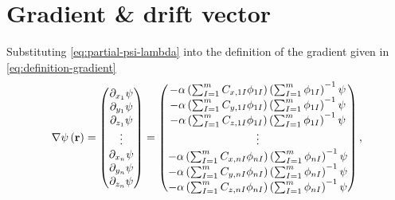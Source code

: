 \section{Gradient \& drift vector}
Substituting \cref{eq:partial-psi-lambda}
into the definition of the gradient given in \cref{eq:definition-gradient}
\begin{equation}
    \nabla
    \psi \left( \boldsymbol{\mathrm{r}} \right)
    =
    \begin{pmatrix}
        \partial_{x_1} \psi \\
        \partial_{y_1} \psi \\
        \partial_{z_1} \psi \\
        \vdots \\
        \partial_{x_n} \psi \\
        \partial_{y_n} \psi \\
        \partial_{z_n} \psi
    \end{pmatrix}
    =
    \begin{pmatrix}
        -\alpha
        \left( 
            \sum_{I=1}^{m} 
            C_{x,1I}
            \phi_{1I} 
        \right)
        \left( 
            \sum_{I=1}^{m} \phi_{1I}
        \right)^{-1}
        \psi
        \\
        -\alpha
        \left( 
            \sum_{I=1}^{m} 
            C_{y,1I}
            \phi_{1I} 
        \right)
        \left( 
            \sum_{I=1}^{m} \phi_{1I}
        \right)^{-1}
        \psi
        \\
        -\alpha
        \left( 
            \sum_{I=1}^{m} 
            C_{z,1I}
            \phi_{1I} 
        \right)
        \left( 
            \sum_{I=1}^{m} \phi_{1I}
        \right)^{-1}
        \psi
        \\
        \vdots \\
        -\alpha
        \left( 
            \sum_{I=1}^{m} 
            C_{x,nI}
            \phi_{nI} 
        \right)
        \left( 
            \sum_{I=1}^{m} \phi_{nI}
        \right)^{-1}
        \psi
        \\
        -\alpha
        \left( 
            \sum_{I=1}^{m} 
            C_{y,nI}
            \phi_{nI} 
        \right)
        \left( 
            \sum_{I=1}^{m} \phi_{nI}
        \right)^{-1}
        \psi
        \\
        -\alpha
        \left( 
            \sum_{I=1}^{m} 
            C_{z,nI}
            \phi_{nI} 
        \right)
        \left( 
            \sum_{I=1}^{m} \phi_{nI}
        \right)^{-1}
        \psi
    \end{pmatrix}
    ,
\end{equation}
